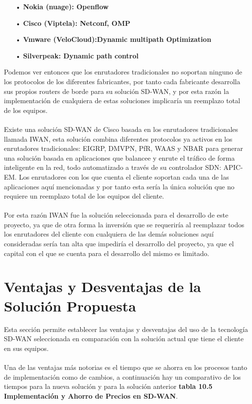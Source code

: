 \begin{itemize}
\item[•]\textbf{Nokia (nuage): Openflow}
\item[•]\textbf{Cisco (Viptela): Netconf, OMP}
\item[•]\textbf{Vmware (VeloCloud):Dynamic multipath Optimization}
\item[•]\textbf{Silverpeak: Dynamic path control}
\end{itemize}
Podemos ver entonces que los enrutadores tradicionales no soportan ninguno de los protocolos de los diferentes fabricantes, por tanto cada fabricante desarrolla sus propios routers de borde para su solución SD-WAN, y por esta razón la implementación de cualquiera de estas soluciones implicaría un reemplazo total de los equipos.
\\
\\
Existe una solución SD-WAN de Cisco basada en los enrutadores tradicionales llamada IWAN, esta solución combina diferentes protocolos ya activos en los enrutadores tradicionales: EIGRP, DMVPN, PfR, WAAS y NBAR para generar una solución basada en aplicaciones que balancee y enrute el tráfico de forma inteligente en la red, todo automatizado a través de su controlador SDN: APIC-EM. Los enrutadores con los que cuenta el cliente soportan cada una de las aplicaciones aquí mencionadas y por tanto esta sería la única solución que no requiere un reemplazo total de los equipos del cliente.
\\
\\
Por esta razón IWAN fue la solución seleccionada para el desarrollo de este proyecto, ya que de otra forma la inversión que se requeriría al reemplazar todos los enrutadores del cliente con cualquiera de las demás soluciones aquí consideradas sería tan alta que impediría el desarrollo del proyecto, ya que el capital con el que se cuenta para el desarrollo del mismo es limitado.

\section{Ventajas y Desventajas de la Solución Propuesta} %
\label{sec:Ventajas y Desventajas de la Solución Propuesta}

Esta sección permite establecer las ventajas y desventajas del uso de la tecnología SD-WAN seleccionada en comparación con la solución actual que tiene el cliente en sus equipos.
\\
\\
Una de las ventajas más notorias es el tiempo que se ahorra en los procesos tanto de implementación como de cambios, a continuación hay un comparativo de los tiempos para la nueva solución y para la solución anterior \textbf{tabla 10.5 Implementación y Ahorro de Precios en SD-WAN}.

